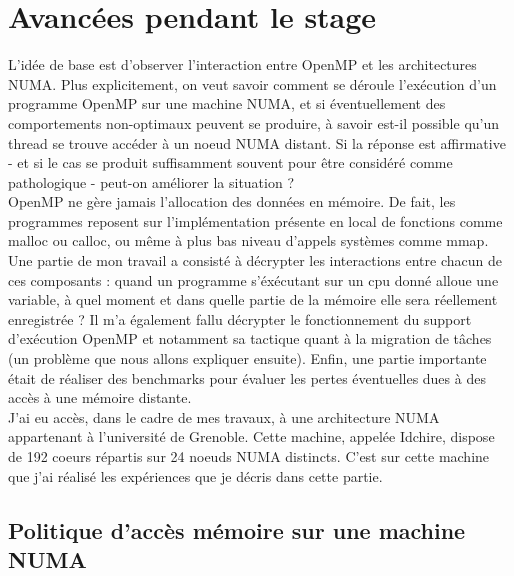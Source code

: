 \documentclass{report}
\begin{document}
\section{Avancées pendant le stage}
L'idée de base est d'observer l'interaction entre OpenMP et les architectures NUMA. Plus explicitement,
on veut savoir comment se déroule l'exécution d'un programme OpenMP sur une machine NUMA, et si 
éventuellement des comportements non-optimaux peuvent se produire, à savoir est-il possible qu'un thread
se trouve accéder à un noeud NUMA distant. Si la réponse est affirmative - et si le cas se produit 
suffisamment souvent pour être considéré comme pathologique - peut-on améliorer la situation ?
\\OpenMP ne gère jamais l'allocation des données en mémoire. De fait, les programmes reposent sur 
l'implémentation présente en local de fonctions comme malloc ou calloc, ou même à plus bas niveau
d'appels systèmes comme mmap. Une partie de mon travail a consisté à décrypter les interactions
entre chacun de ces composants : quand un programme s'éxécutant sur un cpu donné alloue une variable,
à quel moment et dans quelle partie de la mémoire elle sera réellement enregistrée ? Il m'a également fallu
décrypter le fonctionnement du support d'exécution OpenMP et notamment sa tactique quant à la migration de
tâches (un problème que nous allons expliquer ensuite). Enfin, une partie importante était de réaliser des 
benchmarks pour évaluer les pertes éventuelles dues à des accès à une mémoire distante. 
\\J'ai eu accès, dans le cadre de mes travaux, à une architecture NUMA appartenant à l'université de 
Grenoble. Cette machine, appelée Idchire, dispose de 192 coeurs répartis sur 24 noeuds NUMA distincts. 
C'est sur cette machine que j'ai réalisé les expériences que je décris dans cette partie.

\subsection{Politique d'accès mémoire sur une machine NUMA}
\end{document}
